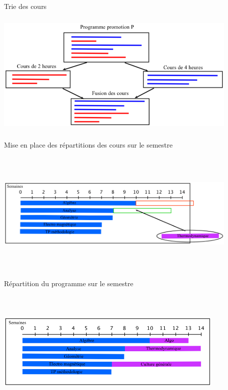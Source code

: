 \documentclass{beamer}
\begin{document}
\begin{frame}
Trie des cours
\begin{center}
\includegraphics [width=117mm, height=60mm]{Dessin1.png}
\end{center}
\end{frame}

\begin{frame}
Mise en place des répartitions des cours sur le semestre
\begin{center}
\includegraphics [width=117mm, height=60mm]{RepartitionSemestre2.png}
\end{center}
\end{frame}

\begin{frame}
Répartition du programme sur le semestre
\begin{center}
\includegraphics [width=110mm, height=60mm]{RepartitionSemestre.png}
\end{center}
\end{frame}
\end{document}
